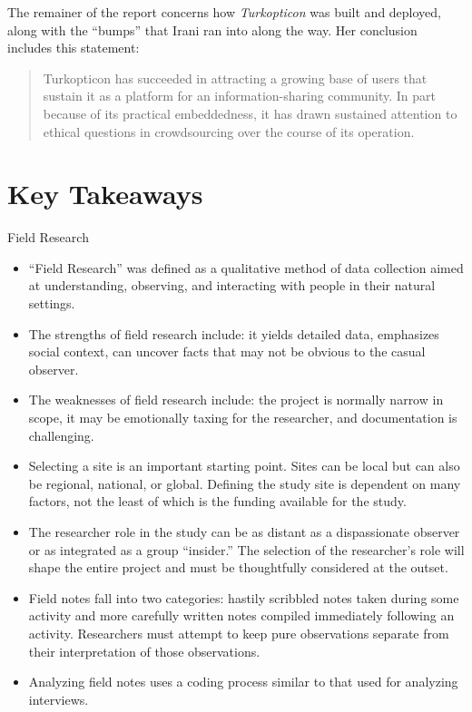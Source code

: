 The remainer of the report concerns how \textit{Turkopticon} was built and deployed, along with the ``bumps'' that Irani ran into along the way. Her conclusion includes this statement:

\begin{quote}
	Turkopticon has succeeded in attracting a growing base of users that sustain it as a platform for an information-sharing community. In part because of its practical embeddedness, it has drawn sustained attention to ethical questions in crowdsourcing over the course of its operation.
\end{quote}



\section{Key Takeaways}\label{ch11:summary}

\begin{center}
	\begin{tkawybox}{Field Research}
		\begin{itemize}
			\item ``Field Research'' was defined as a qualitative method of data collection aimed at understanding, observing, and interacting with people in their natural settings.
			\item The strengths of field research include: it yields detailed data, emphasizes social context, can uncover facts that may not be obvious to the casual observer.
			\item The weaknesses of field research include: the project is normally narrow in scope, it may be emotionally taxing for the researcher, and documentation is challenging.
			\item Selecting a site is an important starting point. Sites can be local but can also be regional, national, or global. Defining the study site is dependent on many factors, not the least of which is the funding available for the study.
			\item The researcher role in the study can be as distant as a dispassionate observer or as integrated as a group ``insider.'' The selection of the researcher's role will shape the entire project and must be thoughtfully considered at the outset.
			\item Field notes fall into two categories: hastily scribbled notes taken during some activity and more carefully written notes compiled immediately following an activity. Researchers must attempt to keep pure observations separate from their interpretation of those observations.
			\item Analyzing field notes uses a coding process similar to that used for analyzing interviews.
		\end{itemize}
	\end{tkawybox}
\end{center}
